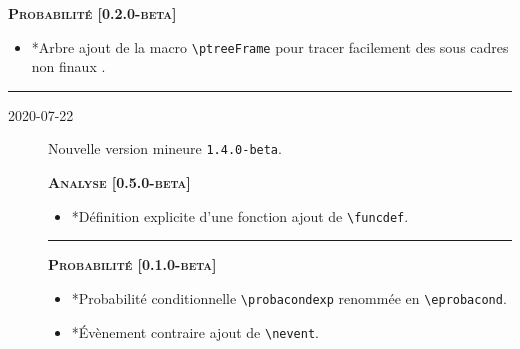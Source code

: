 \documentclass[12pt,a4paper]{book}
\makeatletter
\newcommand\env[1]{\texttt{#1}}
\newcommand\macro[1]{\env{\textbackslash{}#1}}
\theoremstyle{definition}
\newcommand\separation{
	\medskip
	\hfill\rule{0.5\textwidth}{0.75pt}\hfill
	\medskip
}
\newcommand\topic{\@ifstar{\@topic@star}{\@topic@no@star}}
\newcommand\@topic@no@star[1]{%
	\textbf{\textsc{#1}.}%
}
\newcommand\@topic@star[1]{%
	\textbf{\textsc{#1} :}%
}
\makeatother
\begin{document}
{{\begin{description}
    
    \begin{center}
        \textbf{\textsc{Probabilité [0.2.0-beta]}}
    \end{center}
    
    \begin{itemize}[itemsep=.5em]
        \item \topic*{Arbre}
              ajout de la macro \macro{ptreeFrame} pour tracer facilement des sous cadres non \og finaux \fg.
    
        
    \end{itemize}
    
    
    \separation
\end{description}

\begin{description}    \item[2020-07-22] Nouvelle version mineure \verb+1.4.0-beta+.
    
    
    
    
    \begin{center}
        \textbf{\textsc{Analyse [0.5.0-beta]}}
    \end{center}
    
    \begin{itemize}[itemsep=.5em]
        \item \topic*{Définition explicite d'une fonction}
              ajout de \macro{funcdef}.
    
        
    \end{itemize}
    
    
    \separation
    
    
    
    
    \begin{center}
        \textbf{\textsc{Probabilité [0.1.0-beta]}}
    \end{center}
    
    \begin{itemize}[itemsep=.5em]
        \item \topic*{Probabilité conditionnelle}
              \macro{probacondexp} renommée en  \macro{eprobacond}.
    
    
        
    
        \item \topic*{Évènement contraire}
              ajout de \macro{nevent}.
    

\end{itemize}
\end{description}}}
\end{document}

